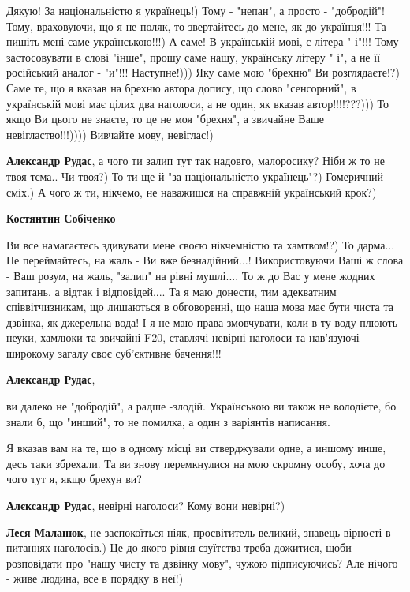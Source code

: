 \begin{itemize}
\begin{itemize}
\obeycr
Дякую!
За національністю я українець!)
Тому - "непан", а просто - "добродій"!
Тому, враховуючи, що я не поляк, то звертайтесь до мене, як до українця!!! Та пишіть мені саме українською!!!)
А саме! В українській мові, є літера " і"!!! Тому застосовувати в слові "інше", прошу саме нашу, українську літеру " і", а не її російський аналог - "и"!!!
Наступне!)))
Яку саме мою "брехню" Ви розглядаєте!?) Саме те, що я вказав на брехню автора допису, що слово "сенсорний", в українській мові має цілих два наголоси, а не один, як вказав автор!!!!???)))
То якщо Ви цього не знаєте, то це не моя "брехня", а звичайне Ваше невігластво!!!))))
Вивчайте мову, невіглас!)
\restorecr

\textbf{Александр Рудас}, а чого ти залип тут так надовго, малоросику? Ніби ж то не твоя тєма.. Чи твоя?)
То ти ще й "за національністю українець"?)
Гомеричний сміх.) А чого ж ти, нікчемо, не наважишся на справжній український крок?)

\textbf{Костянтин Собіченко}

\obeycr
Ви все намагаєтесь здивувати мене своєю нікчемністю та хамтвом!?) То дарма...
Не переймайтесь, на жаль - Ви вже безнадійний...! Використовуючи Ваші ж слова - Ваш розум, на жаль, "залип" на рівні мушлі.... То ж до Вас у мене жодних запитань, а відтак і відповідей....
Та я маю донести, тим адекватним співвітчизникам, що лишаються в обговоренні, що наша мова має бути чиста та дзвінка, як джерельна вода!
І я не маю права змовчувати, коли в ту воду плюють неуки, хамлюки та звичайні F20, ставлячі невірні наголоси та нав'язуючі широкому загалу своє суб'єктивне бачення!!!
\restorecr

\textbf{Александр Рудас}, 

ви далеко не "добродій", а радше -злодій. Українською ви також не володієте, бо
знали б, що "инший", то не помилка, а один з варіянтів написання.

Я вказав вам на те, що в одному місці ви стверджували одне, а иншому инше, десь
таки збрехали. Та ви знову перемкнулися на мою скромну особу, хоча до чого тут
я, якщо брехун ви?

\textbf{Алєксандр Рудас}, невірні наголоси? Кому вони невірні?)

\textbf{Леся Маланюк}, не заспокоїться ніяк, просвітитель великий, знавець вірності в питаннях наголосів.)
Це до якого рівня єзуїтства треба дожитися, щоби розповідати про "нашу чисту та дзвінку мову", чужою підписуючись? Але нічого - живе людина, все в порядку в неї!)


\end{itemize}
\end{itemize}
